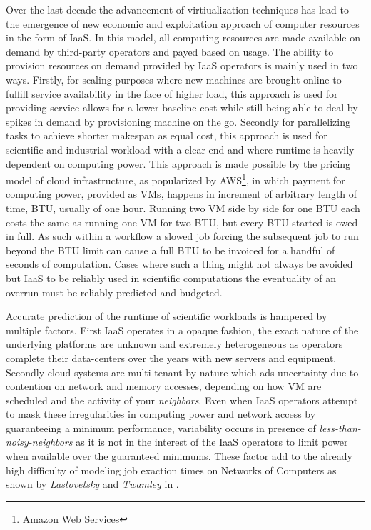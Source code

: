 \documentclass[10pt,conference,compsocconf]{IEEEtran}
\begin{document}
Over the  last decade the advancement  of virtiualization techniques has  lead to
the emergence of new economic and exploitation approach of computer resources in
the form of \ac{IaaS}. In this model, all computing resources are made available
on demand  by third-party operators  and payed based  on usage.  The  ability to
provision resources on demand provided by  \ac{IaaS} operators is mainly used in
two ways.  Firstly,  for scaling purposes where new machines  are brought online
to fulfill  service availability in  the face of  higher load, this  approach is
used for  providing service allows for  a lower baseline cost  while still being
able to deal  by spikes in demand  by provisioning machine on  the go.  Secondly
for parallelizing tasks to achieve shorter makespan as equal cost, this approach
is  used for  scientific and  industrial  workload with  a clear  end and  where
runtime is heavily dependent on computing power.  This approach is made possible
by   the   pricing   model   of  cloud   infrastructure,   as   popularized   by
AWS\footnote{Amazon  Web  Services},  in  which  payment  for  computing  power,
provided  as  \acp{VM},  happens  in  increment of  arbitrary  length  of  time,
\ac{BTU}, usually of one hour. Running two \ac{VM} side by side for one \ac{BTU}
each costs  the same  as running  one \ac{VM}  for two  \ac{BTU}, but  every BTU
started is  owed in full.  As  such within a  workflow a slowed job  forcing the
subsequent job to run beyond the \ac{BTU}  limit can cause a full \ac{BTU} to be
invoiced for a handful of seconds of computation. Cases where such a thing might
not  always  be  avoided  but  \ac{IaaS}  to  be  reliably  used  in  scientific
computations  the eventuality  of  an  overrun must  be  reliably predicted  and
budgeted.

Accurate  prediction of  the  runtime  of scientific  workloads  is hampered  by
multiple factors. First \ac{IaaS} operates in a opaque fashion, the exact nature
of the underlying platforms are unknown and extremely heterogeneous as operators
complete  their data-centers  over the  years  with new  servers and  equipment.
Secondly cloud systems  are multi-tenant by nature which ads  uncertainty due to
contention  on  network  and  memory  accesses, depending  on  how  \ac{VM}  are
scheduled  and  the activity  of  your  \emph{neighbors}.  Even  when  \ac{IaaS}
operators attempt  to mask these  irregularities in computing power  and network
access by guaranteeing a minimum  performance, variability occurs in presence of
\emph{less-than-noisy-neighbors} as it  is not in the interest  of the \ac{IaaS}
operators to  limit power  when available over  the guaranteed  minimums.  These
factor add  to the  already high  difficulty of modeling  job exaction  times on
Networks of Computers as shown by \emph{Lastovetsky} and \emph{Twamley} in
\cite{Lastovetsky05}.
\end{document}
